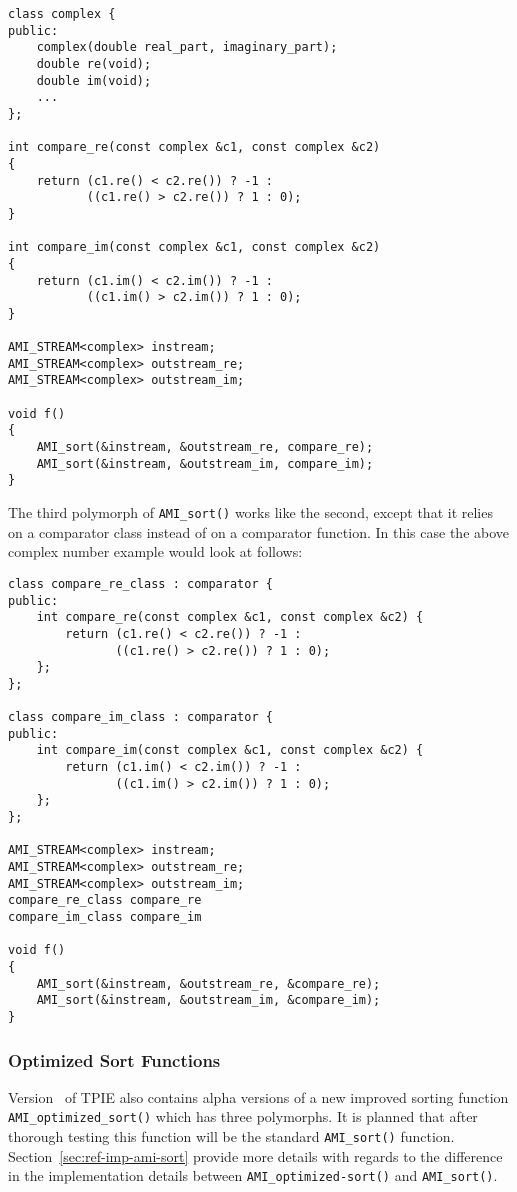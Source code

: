 \begin{verbatim}
class complex {
public:
    complex(double real_part, imaginary_part);
    double re(void);
    double im(void);
    ...
};

int compare_re(const complex &c1, const complex &c2)
{
    return (c1.re() < c2.re()) ? -1 :
           ((c1.re() > c2.re()) ? 1 : 0);
}

int compare_im(const complex &c1, const complex &c2)
{
    return (c1.im() < c2.im()) ? -1 :
           ((c1.im() > c2.im()) ? 1 : 0);
}

AMI_STREAM<complex> instream;
AMI_STREAM<complex> outstream_re;
AMI_STREAM<complex> outstream_im;

void f()
{
    AMI_sort(&instream, &outstream_re, compare_re);
    AMI_sort(&instream, &outstream_im, compare_im);
}
\end{verbatim}

The third polymorph of \verb|AMI_sort()| works like the second, except that
it relies on a comparator class instead of on a comparator function. In this
case the above complex number example would look at follows:

\begin{verbatim}
class compare_re_class : comparator {
public:
    int compare_re(const complex &c1, const complex &c2) {
        return (c1.re() < c2.re()) ? -1 :
               ((c1.re() > c2.re()) ? 1 : 0);
    };
};

class compare_im_class : comparator {
public:
    int compare_im(const complex &c1, const complex &c2) {
        return (c1.im() < c2.im()) ? -1 :
               ((c1.im() > c2.im()) ? 1 : 0);
    };
};

AMI_STREAM<complex> instream;
AMI_STREAM<complex> outstream_re;
AMI_STREAM<complex> outstream_im;
compare_re_class compare_re
compare_im_class compare_im

void f()
{
    AMI_sort(&instream, &outstream_re, &compare_re);
    AMI_sort(&instream, &outstream_im, &compare_im);
}
\end{verbatim}



\subsubsection{Optimized Sort Functions}

Version \version~of TPIE also contains alpha versions of a new improved
sorting function\\ %
\verb|AMI_optimized_sort()| which has three polymorphs. It is planned that
after thorough testing this function will be the standard \verb|AMI_sort()|
function. Section~\ref{sec:ref-imp-ami-sort} provide more details with
regards to the difference in the implementation details between
\verb|AMI_optimized-sort()| and \verb|AMI_sort()|.

